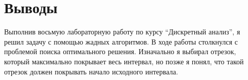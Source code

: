 \section{Выводы}
Выполнив восьмую лабораторную работу по курсу \enquote{Дискретный анализ}, я решил задачу с помощью жадных алгоритмов. В ходе работы
столкнулся с проблемой поиска оптимального решения. Изначально я выбирал отрезок, который максимально
покрывает весь интервал, но позже я понял, что такой отрезок должен покрывать начало исходного интервала.
\pagebreak
